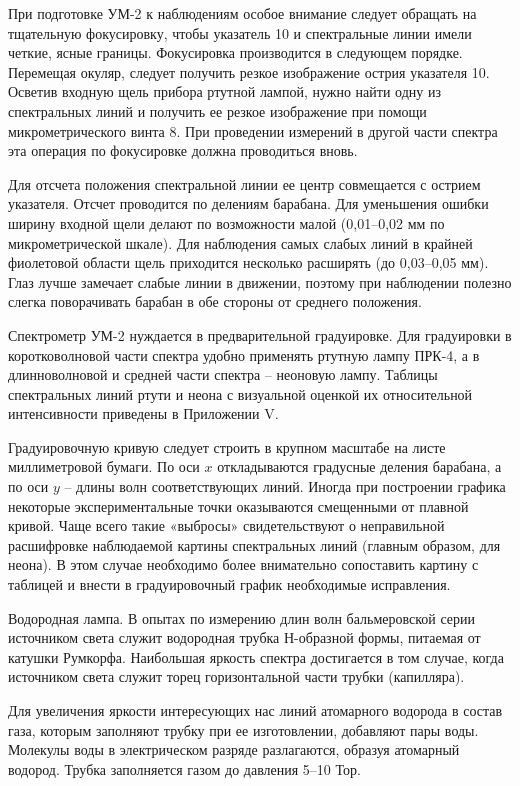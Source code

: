 \documentclass[a4paper,12pt]{article}
\begin{document}
При подготовке УМ-2 к наблюдениям особое внимание следует обращать на тщательную фокусировку, чтобы указатель 10 и спектральные линии имели четкие, ясные границы. Фокусировка производится в следующем порядке. Перемещая окуляр, следует получить резкое изображение острия указателя 10. Осветив входную щель прибора ртутной лампой, нужно найти одну из спектральных линий и получить ее резкое изображение при помощи микрометрического винта 8. При проведении измерений в другой части спектра эта операция по фокусировке должна проводиться вновь.

Для отсчета положения спектральной линии ее центр совмещается с острием указателя. Отсчет проводится по делениям барабана. Для уменьшения ошибки ширину входной щели делают по возможности малой (0,01--0,02 мм по микрометрической шкале). Для наблюдения самых слабых линий в крайней фиолетовой области щель приходится несколько расширять (до 0,03--0,05 мм). Глаз лучше замечает слабые линии в движении, поэтому при наблюдении полезно слегка поворачивать барабан в обе стороны от среднего положения.

Спектрометр УМ-2 нуждается в предварительной градуировке. Для градуировки в коротковолновой части спектра удобно применять ртутную лампу ПРК-4, а в длинноволновой и средней части спектра -- неоновую лампу. Таблицы спектральных линий ртути и неона с визуальной оценкой их относительной интенсивности приведены в Приложении V.

Градуировочную кривую следует строить в крупном масштабе на листе миллиметровой бумаги. По оси $x$ откладываются градусные деления барабана, а по оси $y$ -- длины волн соответствующих линий. Иногда при построении графика некоторые экспериментальные точки оказываются смещенными от плавной кривой. Чаще всего такие «выбросы» свидетельствуют о неправильной расшифровке наблюдаемой картины спектральных линий (главным образом, для неона). В этом случае необходимо более внимательно сопоставить картину с таблицей и внести в градуировочный график необходимые исправления.

Водородная лампа. В опытах по измерению длин волн бальмеровской серии источником света служит водородная трубка Н-образной формы, питаемая от катушки Румкорфа. Наибольшая яркость спектра достигается в том случае, когда источником света служит торец горизонтальной части трубки (капилляра).

Для увеличения яркости интересующих нас линий атомарного водорода в состав газа, которым заполняют трубку при ее изготовлении, добавляют пары воды. Молекулы воды в электрическом разряде разлагаются, образуя атомарный водород. Трубка заполняется газом до давления 5--10 Тор.
\end{document}
